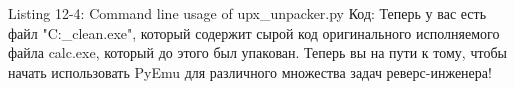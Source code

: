 \documentclass[12pt, a4paper, oneside]{book}
\begin{document}
Listing 12-4: Command line usage of upx\_unpacker.py
Код:
Теперь у вас есть файл "C:\calc\_clean.exe", который содержит сырой код оригинального исполняемого файла calc.exe, который до этого был упакован. Теперь вы на пути к тому, чтобы начать использовать PyEmu для различного множества задач реверс-инженера!
\end{document}
